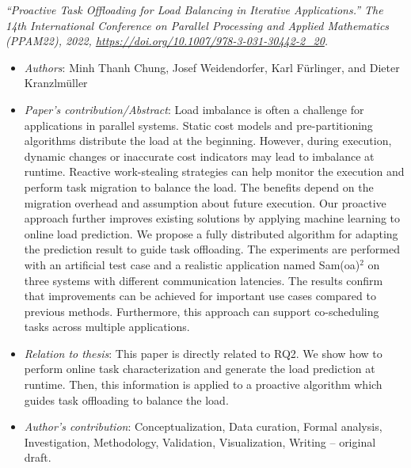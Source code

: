 \textit{``Proactive Task Offloading for Load Balancing in Iterative Applications.'' The 14th International Conference on Parallel Processing and Applied Mathematics (PPAM22), 2022, \url{https://doi.org/10.1007/978-3-031-30442-2_20}.}
\begin{itemize}
	\item \textit{Authors}: Minh Thanh Chung, Josef Weidendorfer, Karl Fürlinger, and Dieter Kranzlmüller
	\item \textit{Paper's contribution/Abstract}: Load imbalance is often a challenge for applications in parallel systems. Static cost models and pre-partitioning algorithms distribute the load at the beginning. However, during execution, dynamic changes or inaccurate cost indicators may lead to imbalance at runtime. Reactive work-stealing strategies can help monitor the execution and perform task migration to balance the load. The benefits depend on the migration overhead and assumption about future execution. Our proactive approach further improves existing solutions by applying machine learning to online load prediction. We propose a fully distributed algorithm for adapting the prediction result to guide task offloading. The experiments are performed with an artificial test case and a realistic application named Sam(oa)$^2$ on three systems with different communication latencies. The results confirm that improvements can be achieved for important use cases compared to previous methods. Furthermore, this approach can support co-scheduling tasks across multiple applications.
	\item \textit{Relation to thesis}: This paper is directly related to RQ2. We show how to perform online task characterization and generate the load prediction at runtime. Then, this information is applied to a proactive algorithm which guides task offloading to balance the load.
	\item \textit{Author's contribution}: Conceptualization, Data curation, Formal analysis, Investigation, Methodology, Validation, Visualization, Writing – original draft.
\end{itemize}

